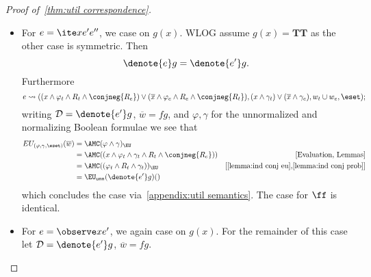 \begin{proof}[Proof of~\cref{thm:util correspondence}]
\begin{itemize}[leftmargin=*]
    \item For $e = \ite x {e'} {e''}$, we case on $g(x)$. 
    WLOG assume $g(x) = \mathbf{TT}$ as the other case is symmetric. 
    Then 
    $$
    \denote{e} g = \denote{e'}g.
    $$
    Furthermore 
    $$e \leadsto ((x \land \varphi_t \land R_t \land \conjneg{R_e}) 
    \lor (\overline{x} \land \varphi_e \land R_e \land \conjneg{R_t}),
    (x \land \gamma_t) \lor (\overline x \land \gamma_e),
    w_t \cup w_e,
          \eset);$$
    writing $\mathcal D = \denote{e'} g$, $\overline w = f g$, and $\varphi, \gamma$ for the unnormalized and normalizing Boolean formulae we see that
    \begin{align*}
      EU_{(\varphi, \gamma, \eset)}(\overline w) 
        &=\AMC(\varphi \land \gamma)_{\EU}&\\
        &=\AMC((x \land \varphi_t \land \gamma_t \land R_t \land \conjneg{R_e}))
          &\text{[Evaluation, Lemmas]}\\
        &=\AMC((\varphi_t \land R_t \land \gamma_t))_{\EU}
        &\text{[\cref{lemma:ind conj eu},\cref{lemma:ind conj prob}]}\\
        &=\EU_{\mathsf{unn}}(\denote{e'} g) (\tt)
    \end{align*}
    which concludes the case via~\cref{appendix:util semantics}. 
    The case for $\ff$ is identical.

  \item For $e = \observe x {e'}$, we again case on $g(x).$ For the remainder of this case let $\mathcal D = \denote{e'} g$, $\overline w = f g$.
  

\end{itemize}
\end{proof}
